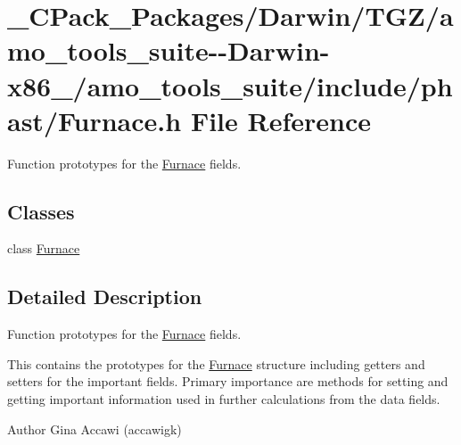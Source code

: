 \hypertarget{___c_pack___packages_2_darwin_2_t_g_z_2amo__tools__suite--_darwin-x86__64_2amo__tools__suite_2include_2phast_2_furnace_8h}{}\section{\+\_\+\+C\+Pack\+\_\+\+Packages/\+Darwin/\+T\+G\+Z/amo\+\_\+tools\+\_\+suite-\/-\/\+Darwin-\/x86\+\_/amo\+\_\+tools\+\_\+suite/include/phast/\+Furnace.h File Reference}
\label{___c_pack___packages_2_darwin_2_t_g_z_2amo__tools__suite--_darwin-x86__64_2amo__tools__suite_2include_2phast_2_furnace_8h}


Function prototypes for the \hyperlink{class_furnace}{Furnace} fields.  


\subsection*{Classes}
\begin{DoxyCompactItemize}
\item 
class \hyperlink{class_furnace}{Furnace}
\end{DoxyCompactItemize}


\subsection{Detailed Description}
Function prototypes for the \hyperlink{class_furnace}{Furnace} fields. 

This contains the prototypes for the \hyperlink{class_furnace}{Furnace} structure including getters and setters for the important fields. Primary importance are methods for setting and getting important information used in further calculations from the data fields.

\begin{DoxyAuthor}{Author}
Gina Accawi (accawigk) 
\end{DoxyAuthor}
